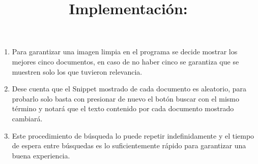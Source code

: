\documentclass{article}
\begin{document}
\begin{itemize}
\begin{enumerate}
                \item Para garantizar una imagen limpia en el programa se decide mostrar los mejores cinco
                documentos, en caso de no haber cinco se garantiza que se muestren solo los que tuvieron
                relevancia.

                \item Dese cuenta que el Snippet mostrado de cada documento es aleatorio, para probarlo solo
                basta con presionar de nuevo el botón buscar con el mismo término y notará que el texto
                contenido por cada documento mostrado cambiará.

                \item Este procedimiento de búsqueda lo puede repetir indefinidamente y el tiempo de espera
                entre búsquedas es lo suficientemente rápido para garantizar una buena experiencia.
                
            \end{enumerate}
    \end{itemize}
\title{\textbf{Implementación:}}
\end{document}
